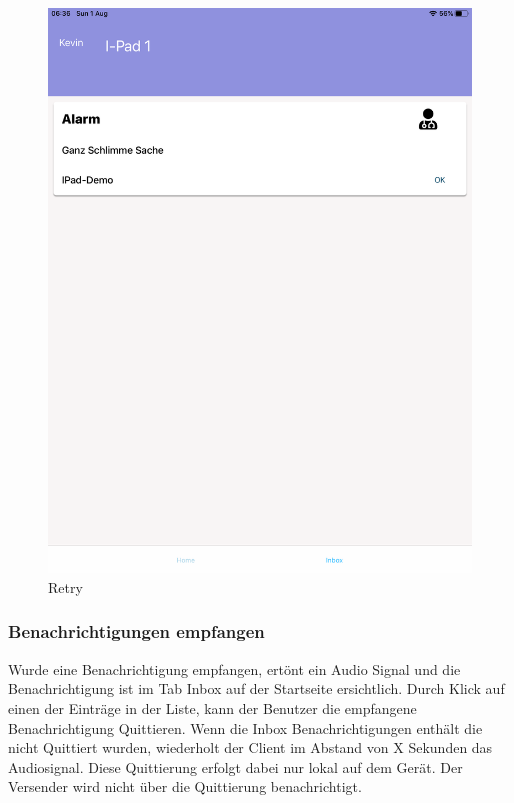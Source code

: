 \begin{figure}[h]
\begin{minipage}[b]{0.4\textwidth}
        \includegraphics[width=\textwidth]{graphics/screenshots/mobileclient/screenshots-inbox}
        \caption{Retry}
    \end{minipage}
    \label{fig:MobileClient-Screens2}
\end{figure}

\clearpage

\subsubsection*{Benachrichtigungen empfangen}

Wurde eine Benachrichtigung empfangen, ertönt ein Audio Signal und die Benachrichtigung ist im Tab Inbox auf der Startseite ersichtlich.
Durch Klick auf einen der Einträge in der Liste, kann der Benutzer die empfangene Benachrichtigung Quittieren.
Wenn die Inbox Benachrichtigungen enthält die nicht Quittiert wurden, wiederholt der Client im Abstand von X Sekunden das Audiosignal.
Diese Quittierung erfolgt dabei nur lokal auf dem Gerät.
Der Versender wird nicht über die Quittierung benachrichtigt.

